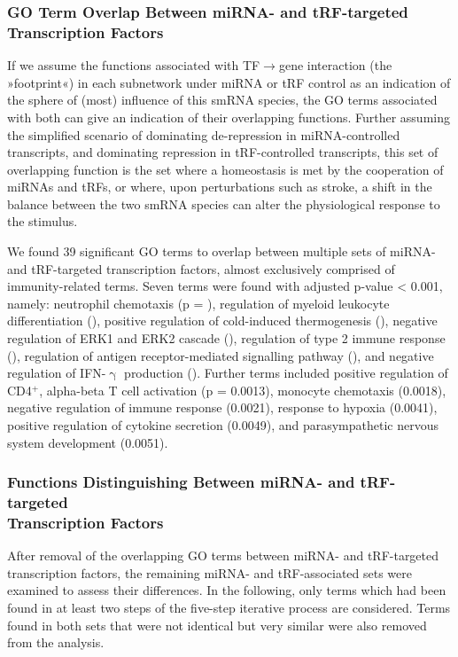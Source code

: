 \subsubsection{GO Term Overlap Between miRNA- and tRF-targeted \\Transcription Factors}
If we assume the functions associated with TF$\to$gene interaction (the »footprint«) in each subnetwork under miRNA or tRF control as an indication of the sphere of (most) influence of this smRNA species, the GO terms associated with both can give an indication of their overlapping functions. Further assuming the simplified scenario of dominating de-repression in miRNA-controlled transcripts, and dominating repression in tRF-controlled transcripts, this set of overlapping function is the set where a homeostasis is met by the cooperation of miRNAs and tRFs, or where, upon perturbations such as stroke, a shift in the balance between the two smRNA species can alter the physiological response to the stimulus.

We found 39 significant GO terms to overlap between multiple sets of miRNA- and tRF-targeted transcription factors, almost exclusively comprised of immunity-related terms. Seven terms were found with adjusted p-value < 0.001, namely: neutrophil chemotaxis (p = ), regulation of myeloid leukocyte differentiation (), positive regulation of cold-induced thermogenesis (), negative regulation of ERK1 and ERK2 cascade (), regulation of type 2 immune response (), regulation of antigen receptor-mediated signalling pathway (), and negative regulation of IFN-$\upgamma$ production (). Further terms included positive regulation of CD4$^+$, alpha-beta T cell activation (p = 0.0013), monocyte chemotaxis (0.0018), negative regulation of immune response (0.0021), response to hypoxia (0.0041), positive regulation of cytokine secretion (0.0049), and parasympathetic nervous system development (0.0051).

\subsubsection{Functions Distinguishing Between miRNA- and tRF-targeted \\Transcription Factors}
After removal of the overlapping GO terms between miRNA- and tRF-targeted transcription factors, the remaining miRNA- and tRF-associated sets were examined to assess their differences. In the following, only terms which had been found in at least two steps of the five-step iterative process are considered. Terms found in both sets that were not identical but very similar were also removed from the analysis.

